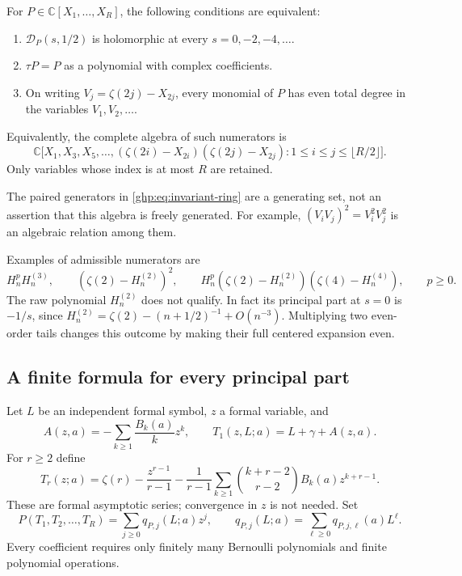 \begin{theorem}\label{ghp:thm:classification}
For $P\in\mathbb C[X_1,\ldots,X_R]$, the following conditions are
 equivalent:
\begin{enumerate}
\item $\mathcal D_P(s,1/2)$ is holomorphic at every
      $s=0,-2,-4,\ldots$.
\item $\tau P=P$ as a polynomial with complex coefficients.
\item On writing $V_j=\zeta(2j)-X_{2j}$, every monomial of $P$ has
      even total degree in the variables $V_1,V_2,\ldots$.
\end{enumerate}
Equivalently, the complete algebra of such numerators is
\begin{equation}\label{ghp:eq:invariant-ring}
 \mathbb C\bigl[X_1,X_3,X_5,\ldots,
  (\zeta(2i)-X_{2i})(\zeta(2j)-X_{2j}):1\leq i\leq j\leq\lfloor R/2\rfloor\bigr].
\end{equation}
Only variables whose index is at most $R$ are retained.
\end{theorem}

The paired generators in \eqref{ghp:eq:invariant-ring} are a generating
set, not an assertion that this algebra is freely generated. For
example, $(V_iV_j)^2=V_i^2V_j^2$ is an algebraic relation among them.

Examples of admissible numerators are
\[
 H_n^pH_n^{(3)},\qquad
 (\zeta(2)-H_n^{(2)})^2,\qquad
 H_n^p(\zeta(2)-H_n^{(2)})(\zeta(4)-H_n^{(4)}),
 \qquad p\geq0.
\]
The raw polynomial $H_n^{(2)}$ does not qualify. In fact its principal
part at $s=0$ is $-1/s$, since
$H_n^{(2)}=\zeta(2)-(n+1/2)^{-1}+O(n^{-3})$.
Multiplying two even-order tails changes this outcome by making their
full centered expansion even.

\subsection{A finite formula for every principal part}

Let $L$ be an independent formal symbol, $z$ a formal variable, and
\begin{equation}\label{ghp:def:A}
 A(z,a)=-\sum_{k\geq1}\frac{B_k(a)}kz^k,
 \qquad T_1(z,L;a)=L+\gamma+A(z,a).
\end{equation}
For $r\geq2$ define
\begin{equation}\label{ghp:def:Tr}
 T_r(z;a)=\zeta(r)-\frac{z^{r-1}}{r-1}
 -\frac1{r-1}\sum_{k\geq1}
   \binom{k+r-2}{r-2}B_k(a)z^{k+r-1}.
\end{equation}
These are formal asymptotic series; convergence in $z$ is not needed.
Set
\begin{equation}\label{ghp:def:q}
 P(T_1,T_2,\ldots,T_R)=\sum_{j\geq0}q_{P,j}(L;a)z^j,
 \qquad q_{P,j}(L;a)=\sum_{\ell\geq0}q_{P,j,\ell}(a)L^\ell.
\end{equation}
Every coefficient requires only finitely many Bernoulli polynomials and
finite polynomial operations.

